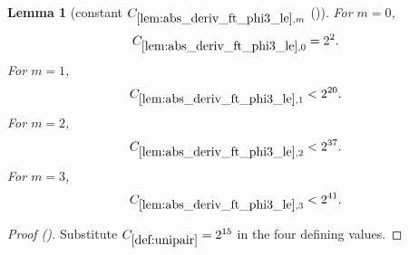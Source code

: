 \documentclass[12pt,reqno]{amsart}
\newcommand{\auto}{{({\tiny\faCar})}}
\theoremstyle{plain}
\newtheorem{lemma}[theorem]{Lemma}
\numberwithin{equation}{section}
\theoremstyle{remark}
\newcommand{\uses}[1]{}
\newcommand{\usesdefs}[1]{}
\begin{document}
\begin{lemma}[constant $C_{\ref{lem:abs_deriv_ft_phi3_le},m}$ \auto]\label{constant phi three derivative}\uses{lem:abs_deriv_ft_phi3_le}\usesdefs{def:unipair}
For $m=0$,
\begin{equation}\label{constant phi three derivative bound}
C_{\ref{lem:abs_deriv_ft_phi3_le},0}=2^2.
\end{equation}
For $m=1$,
\begin{equation}\label{auto:constant-phi-three-derivative-one}
C_{\ref{lem:abs_deriv_ft_phi3_le},1}<2^{20}.
\end{equation}
For $m=2$,
\begin{equation}\label{auto:constant-phi-three-derivative-two}
C_{\ref{lem:abs_deriv_ft_phi3_le},2}<2^{37}.
\end{equation}
For $m=3$,
\begin{equation}\label{auto:constant-phi-three-derivative-three}
C_{\ref{lem:abs_deriv_ft_phi3_le},3}<2^{41}.
\end{equation}
\end{lemma}
\begin{proof}[Proof \auto]
Substitute $C_{\ref{def:unipair}}=2^{15}$ in the four defining values.
\end{proof}
\end{document}
